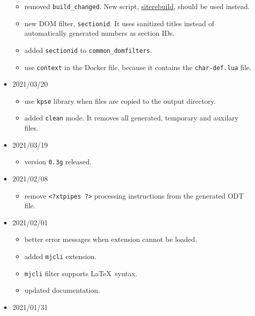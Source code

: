 \begin{itemize}
  \begin{itemize}
  \tightlist
  \item
    removed \texttt{build\_changed}. New script,
    \href{https://github.com/michal-h21/siterebuild}{siterebuild},
    should be used instead.
  \item
    new DOM filter, \texttt{sectionid}. It uses sanitized titles instead
    of automatically generated numbers as section IDs.
  \item
    added \texttt{sectionid} to \texttt{common\_domfilters}.
  \item
    use \texttt{context} in the Docker file, because it contains the
    \texttt{char-def.lua} file.
  \end{itemize}
\item
  2021/03/20

  \begin{itemize}
  \tightlist
  \item
    use \texttt{kpse} library when files are copied to the output
    directory.
  \item
    added \texttt{clean} mode. It removes all generated, temporary and
    auxilary files.
  \end{itemize}
\item
  2021/03/19

  \begin{itemize}
  \tightlist
  \item
    version \texttt{0.3g} released.
  \end{itemize}
\item
  2021/02/08

  \begin{itemize}
  \tightlist
  \item
    remove \texttt{\textless{}?xtpipes\ ?\textgreater{}} processing
    instructions from the generated ODT file.
  \end{itemize}
\item
  2021/02/01

  \begin{itemize}
  \tightlist
  \item
    better error messages when extension cannot be loaded.
  \item
    added \texttt{mjcli} extension.
  \item
    \texttt{mjcli} filter supports \LaTeX~syntax.
  \item
    updated documentation.
  \end{itemize}
\item
  2021/01/31


\end{itemize}

